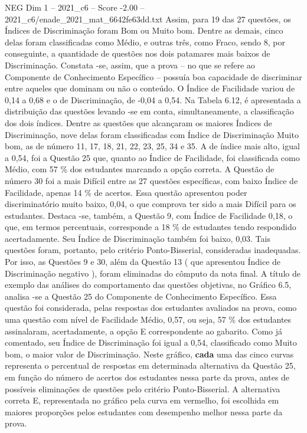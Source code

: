 \begin{textsample}{NEG Dim 1 – 2021\_c6 – Score -2.00 – 2021\_c6/enade\_2021\_mat\_6642fe63dd.txt}
Assim, para 19 das 27 questões, os Índices de Discriminação foram Bom ou Muito bom.
Dentre as demais, cinco delas foram classificadas como Médio, e outras três, como Fraco, sendo 8, por conseguinte, a quantidade de questões nos dois patamares mais baixos de Discriminação.
Constata -se, assim, que a prova – no que se refere ao Componente de Conhecimento Específico – possuía boa capacidade de discriminar entre aqueles que dominam ou não o conteúdo.
O Índice de Facilidade variou de 0,14 a 0,68 e o de Discriminação, de -0,04 a 0,54.
Na Tabela 6.12, é apresentada a distribuição das questões levando -se em conta, simultaneamente, a classificação dos dois índices.
Dentre as questões que alcançaram os maiores Índices de Discriminação, nove delas foram classificadas com Índice de Discriminação Muito bom, as de número 11, 17, 18, 21, 22, 23, 25, 34 e 35.
A de índice mais alto, igual a 0,54, foi a Questão 25 que, quanto ao Índice de Facilidade, foi classificada como Médio, com 57 \% dos estudantes marcando a opção correta.
A Questão de número 30 foi a mais Difícil entre as 27 questões específicas, com baixo Índice de Facilidade, apenas 14 \% de acertos.
Essa questão apresentou poder discriminatório muito baixo, 0,04, o que comprova ter sido a mais Difícil para os estudantes.
Destaca -se, também, a Questão 9, com Índice de Facilidade 0,18, o que, em termos percentuais, corresponde a 18 \% de estudantes tendo respondido acertadamente.
Seu Índice de Discriminação também foi baixo, 0,03.
Tais questões foram, portanto, pelo critério Ponto-Bisserial, consideradas inadequadas.
Por isso, as Questões 9 e 30, além da Questão 13 ( que apresentou Índice de Discriminação negativo ), foram eliminadas do cômputo da nota final.
A título de exemplo das análises do comportamento das questões objetivas, no Gráfico 6.5, analisa -se a Questão 25 do Componente de Conhecimento Específico.
Essa questão foi considerada, pelas respostas dos estudantes avaliados na prova, como uma questão com nível de Facilidade Médio, 0,57, ou seja, 57 \% dos estudantes assinalaram, acertadamente, a opção E correspondente ao gabarito.
Como já comentado, seu Índice de Discriminação foi igual a 0,54, classificado como Muito bom, o maior valor de Discriminação.
Neste gráfico, \textbf{cada} uma das cinco curvas representa o percentual de respostas em determinada alternativa da Questão 25, em função do número de acertos dos estudantes nessa parte da prova, antes de possíveis eliminações de questões pelo critério Ponto-Bisserial.
A alternativa correta E, representada no gráfico pela curva em vermelho, foi escolhida em maiores proporções pelos estudantes com desempenho melhor nessa parte da prova.

\end{textsample}
